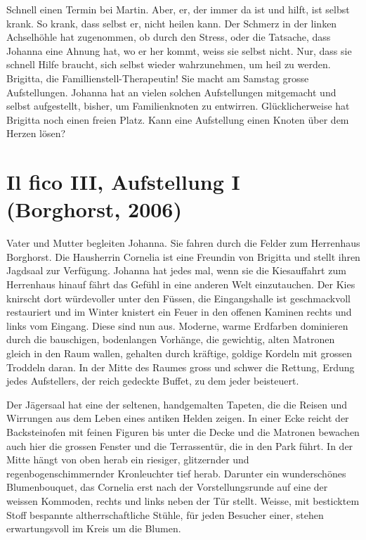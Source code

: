 \documentclass[10pt,titlepage,a5paper]{book}
\begin{document}
Schnell einen Termin bei Martin. Aber, er, der immer da ist und hilft, ist selbst krank. So krank, dass  selbst er, nicht heilen kann. Der Schmerz in der linken Achselhöhle hat zugenommen, ob durch den Stress, oder die Tatsache, dass Johanna eine Ahnung hat, wo er her kommt, weiss sie selbst nicht. Nur, dass sie schnell Hilfe braucht, sich selbst wieder wahrzunehmen, um heil zu werden. Brigitta, die Famillienstell-Therapeutin!  Sie macht am Samstag grosse Aufstellungen. Johanna hat an vielen solchen Aufstellungen mitgemacht und selbst aufgestellt, bisher, um Familienknoten zu entwirren. Glücklicherweise hat Brigitta noch einen freien Platz.  Kann eine Aufstellung einen Knoten über dem Herzen lösen?



\section*{Il fico III, Aufstellung I (Borghorst, 2006)}



Vater und Mutter begleiten Johanna. Sie fahren durch die Felder zum Herrenhaus Borghorst. Die Hausherrin Cornelia ist eine Freundin von Brigitta und stellt ihren Jagdsaal zur Verfügung. Johanna hat jedes mal, wenn sie die Kiesauffahrt zum Herrenhaus hinauf fährt das Gefühl in eine anderen Welt einzutauchen. Der Kies knirscht dort würdevoller unter den Füssen, die Eingangshalle ist geschmackvoll restauriert und im Winter knistert ein Feuer in den offenen Kaminen rechts und links vom Eingang. Diese sind nun aus. Moderne, warme Erdfarben dominieren durch die bauschigen, bodenlangen Vorhänge, die gewichtig, alten Matronen gleich in den Raum wallen, gehalten durch kräftige, goldige Kordeln mit grossen Troddeln daran. In der Mitte des Raumes gross und schwer die Rettung, Erdung jedes Aufstellers, der reich gedeckte Buffet, zu dem jeder beisteuert.

Der Jägersaal hat eine der seltenen, handgemalten Tapeten, die die Reisen und Wirrungen aus dem Leben eines antiken Helden zeigen. In einer Ecke reicht der Backsteinofen mit feinen Figuren bis unter die Decke und die Matronen bewachen auch hier die grossen Fenster und die Terrassentür, die in den Park führt. In der Mitte hängt von oben herab ein riesiger, glitzernder und regenbogenschimmernder Kronleuchter tief herab. Darunter ein wunderschönes Blumenbouquet, das Cornelia erst nach der Vorstellungsrunde auf eine der weissen Kommoden, rechts und links neben der Tür stellt. Weisse, mit besticktem Stoff bespannte altherrschaftliche Stühle, für jeden Besucher einer, stehen erwartungsvoll im Kreis um die Blumen.
\end{document}
